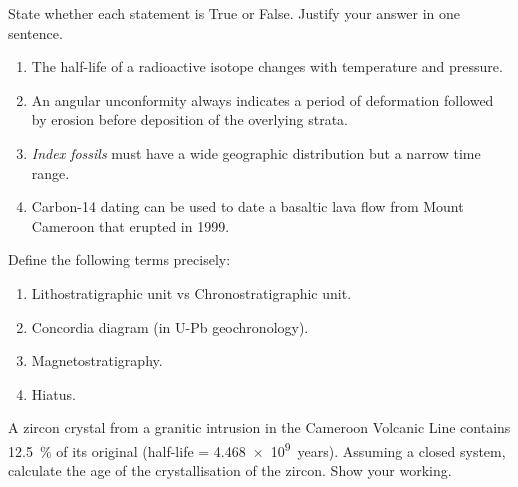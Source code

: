 \documentclass[11pt]{article}
\newcommand{\cle}[1]{{\popxbold\color{popdark}#1}}
\newcounter{popsec}
\newcounter{popsub}
\newcommand{\courssub}[1]{%
  \stepcounter{popsub}%
  \par\vspace{9pt}\noindent{\popxbold\fontsize{11.5}{13}\selectfont\color{popink}{\color{poporange}\thepopsec.\thepopsub}\hspace{6pt}#1}\par\nopagebreak\vspace{4pt}
}
\begin{document}
\begin{exercice}
State whether each statement is True or False. Justify your answer in one sentence.
\begin{enumerate}
\item The half-life of a radioactive isotope changes with temperature and pressure.
\item An angular unconformity always indicates a period of deformation followed by erosion before deposition of the overlying strata.
\item \emph{Index fossils} must have a wide geographic distribution but a narrow time range.
\item Carbon-14 dating can be used to date a basaltic lava flow from Mount Cameroon that erupted in 1999.
\end{enumerate}
\end{exercice}

\begin{exercice}
Define the following terms precisely:
\begin{enumerate}
\item \cle{Lithostratigraphic unit} vs \cle{Chronostratigraphic unit}.
\item \cle{Concordia diagram} (in U-Pb geochronology).
\item \cle{Magnetostratigraphy}.
\item \cle{Hiatus}.
\end{enumerate}
\end{exercice}

\begin{exercice}
A zircon crystal from a granitic intrusion in the \cle{Cameroon Volcanic Line} contains \SI{12.5}{\%} of its original  (half-life = \SI{4.468e9}{years}). Assuming a closed system, calculate the age of the crystallisation of the zircon. Show your working.
\end{exercice}

\courssub{I practise}
\end{document}
